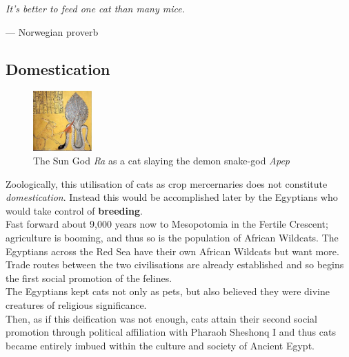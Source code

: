 \documentclass{article}
\begin{document}
\begin{flushright}
\begin{minipage}{8cm}
    \begin{flushleft}
        \emph{It's better to feed one cat than many mice.}
    \end{flushleft}
    \begin{flushright}--- Norwegian proverb\end{flushright}
\end{minipage}
\end{flushright}

\subsection*{Domestication}

\begin{figure}
    \centering
    \includegraphics[width=0.20\textwidth]{img/apep-cat.png}
    \caption{The Sun God \emph{Ra} as a cat slaying the demon snake-god \emph{Apep}}
\end{figure}

Zoologically, this utilisation of cats as crop mercernaries does not constitute \emph{domestication}. Instead this would be accomplished later by the Egyptians who would take control of \textbf{breeding}.\\

Fast forward about 9,000 years now to Mesopotomia in the Fertile Crescent; agriculture is booming, and thus so is the population of African Wildcats. The Egyptians across the Red Sea have their own African Wildcats but want more. Trade routes between the two civilisations are already established and so begins the first social promotion of the \gls{feline}s.\\

The Egyptians kept cats not only as pets, but also believed they were divine creatures of religious significance.\\

Then, as if this deification was not enough, cats attain their second social promotion through political affiliation with Pharaoh Sheshonq I and thus cats became entirely imbued within the culture and society of Ancient Egypt.
\end{document}
